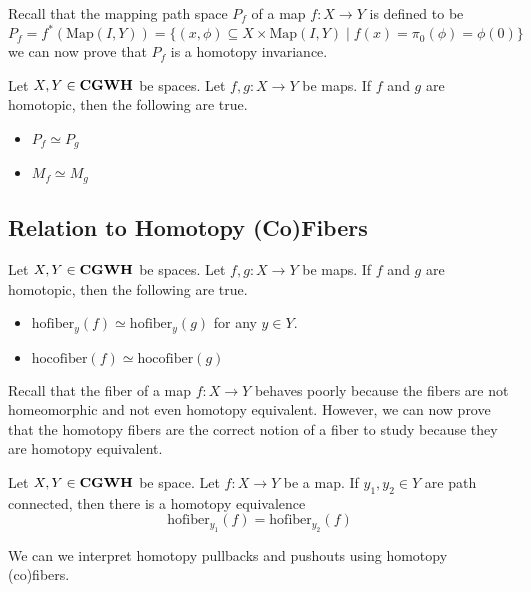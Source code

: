 \documentclass[a4paper]{article}
\begin{document}
Recall that the mapping path space $P_f$ of a map $f:X\to Y$ is defined to be $$P_f=f^\ast(\text{Map}(I,Y))=\{(x,\phi)\subseteq X\times\text{Map}(I,Y)\;|\;f(x)=\pi_0(\phi)=\phi(0)\}$$ we can now prove that $P_f$ is a homotopy invariance. 

\begin{prp}{}{} Let $X,Y\in\bold{CGWH}$ be spaces. Let $f,g:X\to Y$ be maps. If $f$ and $g$ are homotopic, then the following are true. 
\begin{itemize}
\item $P_f\simeq P_g$
\item $M_f\simeq M_g$
\end{itemize}
\end{prp}

\subsection{Relation to Homotopy (Co)Fibers}
\begin{prp}{}{} Let $X,Y\in\bold{CGWH}$ be spaces. Let $f,g:X\to Y$ be maps. If $f$ and $g$ are homotopic, then the following are true. 
\begin{itemize}
\item $\text{hofiber}_y(f)\simeq\text{hofiber}_y(g)$ for any $y\in Y$. 
\item $\text{hocofiber}(f)\simeq\text{hocofiber}(g)$
\end{itemize}
\end{prp}

Recall that the fiber of a map $f:X\to Y$ behaves poorly because the fibers are not homeomorphic and not even homotopy equivalent. However, we can now prove that the homotopy fibers are the correct notion of a fiber to study because they are homotopy equivalent. 

\begin{crl}{}{} Let $X,Y\in\bold{CGWH}$ be space. Let $f:X\to Y$ be a map. If $y_1,y_2\in Y$ are path connected, then there is a homotopy equivalence $$\text{hofiber}_{y_1}(f)=\text{hofiber}_{y_2}(f)$$
\end{crl}

We can we interpret homotopy pullbacks and pushouts using homotopy (co)fibers. 
\end{document}
